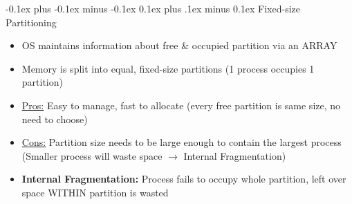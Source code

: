 \documentclass[landscape]{article}
\makeatletter
\renewcommand{\subsection}{\@startsection{subsection}{2}{0mm}%
  {-0.1ex plus -0.1ex minus -0.1ex}%
  {0.1ex plus .1ex minus 0.1ex}%
{\normalfont\scriptsize\bfseries}}
\makeatother
\begin{document}
\begin{multicols*}{6}
    \subsection{Fixed-size Partitioning}
    \begin{itemize}
      \item OS maintains information about free \& occupied partition via an ARRAY
      \item Memory is split into equal, fixed-size partitions (1 process occupies 1 partition)
      \item \underline{Pros:} Easy to manage, fast to allocate (every free partition is same size, no need to choose)
      \item \underline{Cons:} Partition size needs to be large enough to contain the largest process (Smaller process will waste space $\rightarrow$ Internal Fragmentation)
      \item \textbf{Internal Fragmentation:} Process fails to occupy whole partition, left over space WITHIN partition is wasted
    \end{itemize}


\end{multicols*}
\end{document}
